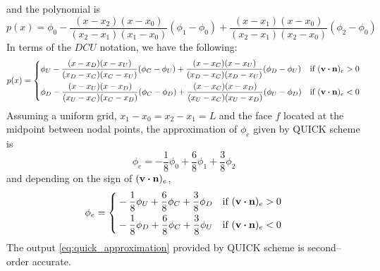 and the polynomial is
\begin{equation} \label{eq:quick_polynomial_1}
	p(x) = 
	\phi_0 - 
	\frac{(x - x_2) (x - x_0)}{(x_2 - x_1)(x_1 - x_0)} (\phi_1 - \phi_0) + 
	\frac{(x - x_1)(x - x_0)}{(x_2 - x_1)(x_2 - x_0)} (\phi_2 - \phi_0)
\end{equation}
In terms of the $DCU$ notation, we have the following:
\begin{equation}
	p(x) = 
	\left\{
	\begin{aligned}		
		&\phi_U - 
		\frac{(x - x_D)(x - x_U)}{(x_D - x_C)(x_C - x_U)} (\phi_C - \phi_U) + 
		\frac{(x - x_C)(x - x_U)}{(x_D - x_C)(x_D - x_U)} (\phi_D - \phi_U)
		& &\text{if } (\vb{v} \vdot \vb{n})_e > 0 \\
		&\phi_D - 
		\frac{(x - x_U)(x - x_D)}{(x_U - x_C)(x_C - x_D)} (\phi_C - \phi_D) + 
		\frac{(x - x_C)(x - x_D)}{(x_U - x_C)(x_U - x_D)} (\phi_U - \phi_D)
		& &\text{if } (\vb{v} \vdot \vb{n})_e < 0
	\end{aligned}
	\right.
\end{equation}
Assuming a uniform grid, \ie $x_1 - x_0 = x_2 - x_1 = L$ and the face $f$
located at the midpoint between nodal points, the approximation of $\phi_e$
given by QUICK scheme is
\begin{equation}
	\phi_e = -\frac{1}{8} \phi_0 + \frac{6}{8} \phi_1 + \frac{3}{8} \phi_2
\end{equation}
and depending on the sign of $(\vb{v} \vdot \vb{n})_e$,
\begin{equation} \label{eq:quick_approximation}
	\phi_e = 
	\left\{
	\begin{aligned}
		&-\frac{1}{8} \phi_U + \frac{6}{8} \phi_C + \frac{3}{8} \phi_D & 
		&\text{if } (\vb{v} \vdot \vb{n})_e > 0 \\
		&-\frac{1}{8} \phi_D + \frac{6}{8} \phi_C + \frac{3}{8} \phi_U & 
		&\text{if } (\vb{v} \vdot \vb{n})_e < 0 \\
	\end{aligned}
	\right.
\end{equation}
The output \eqref{eq:quick_approximation} provided by QUICK scheme is
second--order accurate.